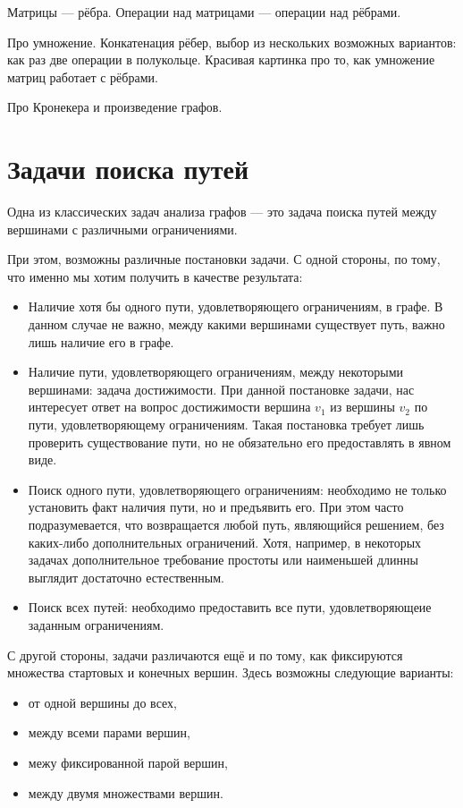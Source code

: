  Матрицы --- рёбра. Операции над матрицами --- операции над рёбрами. 

Про умножение. Конкатенация рёбер, выбор из нескольких возможных вариантов: как раз две операции в полукольце. Красивая картинка про то, как умножение матриц работает с рёбрами. 

Про Кронекера и произведение графов.

\section{Задачи поиска путей}

Одна из классических задач анализа графов --- это задача поиска путей между вершинами с различными ограничениями.

При этом, возможны различные постановки задачи.
С одной стороны, по тому, что именно мы хотим получить в качестве результата:
\begin{itemize}
\item Наличие хотя бы одного пути, удовлетворяющего ограничениям, в графе. В данном случае не важно, между какими вершинами существует путь, важно лишь наличие его в графе.
\item Наличие пути, удовлетворяющего ограничениям, между некоторыми вершинами: задача достижимости.
      При данной постановке задачи, нас интересует ответ на вопрос достижимости вершина $v_1$ из вершины $v_2$ по пути, удовлетворяющему ограничениям.
      Такая постановка требует лишь проверить существование пути, но не обязательно его предоставлять в явном виде.
\item Поиск одного пути, удовлетворяющего ограничениям: необходимо не только установить факт наличия пути, но и  предъявить его. При этом часто подразумевается, что возвращается любой путь, являющийся решением, без каких-либо дополнительных ограничений. Хотя, например, в некоторых задачах дополнительное требование простоты или наименьшей длинны выглядит достаточно естественным.
\item Поиск всех путей: необходимо предоставить все пути, удовлетворяющеие заданным ограничениям.
\end{itemize}

С другой стороны, задачи различаются ещё и по тому, как фиксируются множества стартовых и конечных вершин.
Здесь возможны следующие варианты:
\begin{itemize}
\item от одной вершины до всех,
\item между всеми парами вершин,
\item межу фиксированной парой вершин,
\item между двумя множествами вершин.
\end{itemize}

